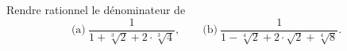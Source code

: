 Rendre rationnel le dénominateur de
\[ \text{(a)}\ \frac{1}{1 + \sqrt[3]{2} + 2 \cdot \sqrt[3]{4}},\qquad \text{(b)}\ \frac{1}{1 - \sqrt[4]{2} + 2 \cdot \sqrt{2} + \sqrt[4]{8}}. \]
